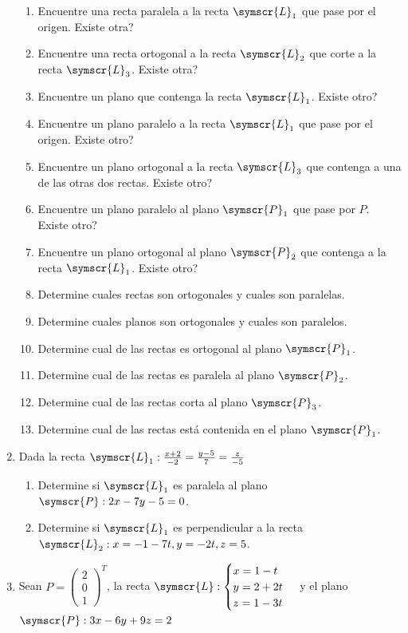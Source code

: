 \documentclass{article}
\def\fancyL{\symscr{L}}
\def\fancyP{\symscr{P}}
\begin{document}
\begin{enumerate}
\begin{enumerate}[label=\listAlph]
        \item Encuentre una recta paralela a la recta \(\fancyL_1\) que pase por el origen. Existe otra?
        \item Encuentre una recta ortogonal a la recta \(\fancyL_2\) que corte a la recta \(\fancyL_3\). Existe otra?
        \item Encuentre un plano que contenga la recta \(\fancyL_1\). Existe otro?
        \item Encuentre un plano paralelo a la recta \(\fancyL_1\) que pase por el origen. Existe otro?
        \item Encuentre un plano ortogonal a la recta \(\fancyL_3\) que contenga a una de las otras dos rectas. Existe otro?
		\item Encuentre un plano paralelo al plano \(\fancyP_1\) que pase por \(P\). Existe otro?
		\item Encuentre un plano ortogonal al plano \(\fancyP_2\) que contenga a la recta \(\fancyL_1\). Existe otro?
		\item Determine cuales rectas son ortogonales y cuales son paralelas.
		\item Determine cuales planos son ortogonales y cuales son paralelos.
		\item Determine cual de las rectas es ortogonal al plano \(\fancyP_1\).
		\item Determine cual de las rectas es paralela al plano \(\fancyP_2\).
		\item Determine cual de las rectas corta al plano \(\fancyP_3\).
		\item Determine cual de las rectas está contenida en el plano \(\fancyP_1\).
    \end{enumerate}
\setcounter{enumi}{17}
\item Dada la recta \(\fancyL_1: \frac{x + 2}{-2} = \frac{y - 5}{7} = \frac{z}{-5}\)
    \begin{enumerate}[label=\listAlph]
        \item Determine si \(\fancyL_1\) es paralela al plano \(\fancyP: 2x - 7y - 5 = 0\).
        \item Determine si \(\fancyL_1\) es perpendicular a la recta \(\fancyL_2: x = -1 -7t, y = -2t, z = 5\).
    \end{enumerate}
\item Sean \(P = \left(\begin{smallmatrix}2 \\ 0 \\ 1\end{smallmatrix}\right)^T\), la recta \(\fancyL: \begin{cases}x = 1 -t \\ y = 2 + 2t \\ z = 1 - 3t\end{cases}\) y el plano \(\fancyP: 3x -6y + 9z = 2\)

\end{enumerate}
\end{document}
